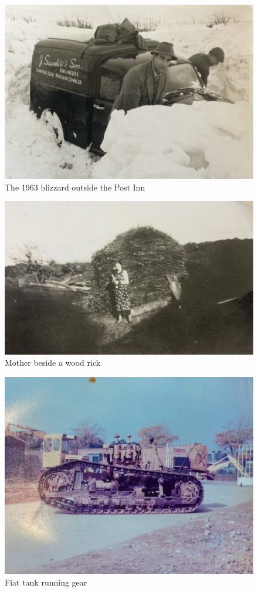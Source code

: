 
\begin{figure}
  \centering
  \includegraphics[width=.9\linewidth]{pictures/cropped/1963 blizzard outside the Post Inn.jpg}
  \caption*{The 1963 blizzard outside the Post Inn}
\end{figure}

\begin{figure}
  \centering
  \includegraphics[width=.9\linewidth]{pictures/cropped/Mother beside a wood rick.jpg}
  \caption*{Mother beside a wood rick}
\end{figure}

\begin{figure}
  \centering
  \includegraphics[width=.8\linewidth]{pictures/cropped/Fiat tank running gear.jpg}
  \caption*{Fiat tank running gear}
\end{figure}

